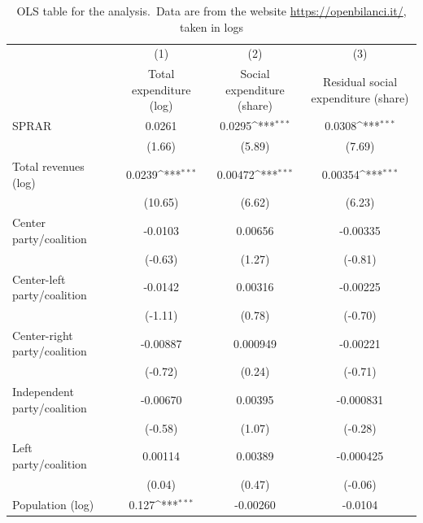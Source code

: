 \documentclass[authoryear,preprint,review,12pt]{elsarticle}
\begin{document}
\begin{table}[H]
    \centering
        \caption{OLS table for the analysis.\ Data are from the website \url{https://openbilanci.it/}, taken in logs}
{
\def\sym#1{\ifmmode^{#1}\else\(^{#1}\)\fi}
\fontsize{7.2}{7.2}\selectfont
\begin{tabular}{l*{3}{c}}
\hline\hline
            &\multicolumn{1}{c}{(1)}&\multicolumn{1}{c}{(2)}&\multicolumn{1}{c}{(3)}\\
            &\multicolumn{1}{c}{Total expenditure (log)}&\multicolumn{1}{c}{Social expenditure (share)}&\multicolumn{1}{c}{Residual social expenditure (share)}\\
\hline
SPRAR          &      0.0261         &      0.0295\sym{***}&      0.0308\sym{***}\\
            &      (1.66)         &      (5.89)         &      (7.69)         \\
[1em]
Total revenues (log)&      0.0239\sym{***}&     0.00472\sym{***}&     0.00354\sym{***}\\
            &     (10.65)         &      (6.62)         &      (6.23)         \\
[1em]
Center party/coalition      &     -0.0103         &     0.00656         &    -0.00335         \\
            &     (-0.63)         &      (1.27)         &     (-0.81)         \\
[1em]
Center-left party/coalition  &     -0.0142         &     0.00316         &    -0.00225         \\
            &     (-1.11)         &      (0.78)         &     (-0.70)         \\
[1em]
Center-right party/coalition&    -0.00887         &    0.000949         &    -0.00221         \\
            &     (-0.72)         &      (0.24)         &     (-0.71)         \\
[1em]
Independent party/coalition &    -0.00670         &     0.00395         &   -0.000831         \\
            &     (-0.58)         &      (1.07)         &     (-0.28)         \\
[1em]
Left party/coalition        &     0.00114         &     0.00389         &   -0.000425         \\
            &      (0.04)         &      (0.47)         &     (-0.06)         \\
[1em]
Population (log)      &       0.127\sym{***}&    -0.00260         &     -0.0104         \\

\end{tabular}}
\end{table}
\end{document}
